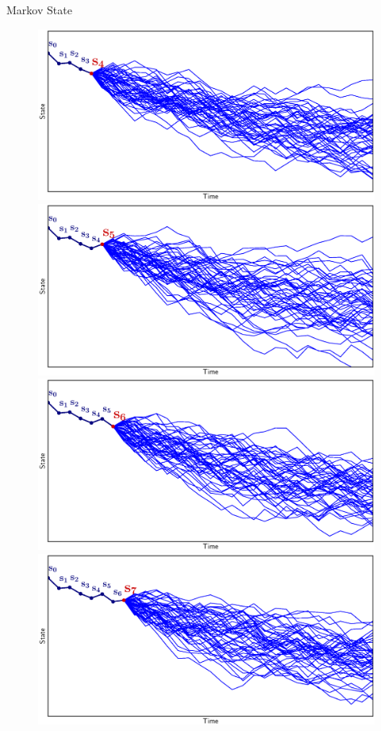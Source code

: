 \documentclass[lecture]{beamer}
\begin{document}
\begin{frame}{\normalsize Markov State}
\begin{overlayarea}{\textwidth}{0.55\textheight}
\begin{figure}
{        }%
        {%
          \includegraphics[width=\FS\textwidth,clip]{Codes/Basics/Markov4.eps}
        }%
        {%
          \includegraphics[width=\FS\textwidth,clip]{Codes/Basics/Markov5.eps}
        }%
        {%
          \includegraphics[width=\FS\textwidth,clip]{Codes/Basics/Markov6.eps}
        }%
        {%
          \includegraphics[width=\FS\textwidth,clip]{Codes/Basics/Markov7.eps}
}
\end{figure}
\end{overlayarea}
\end{frame}
\end{document}
